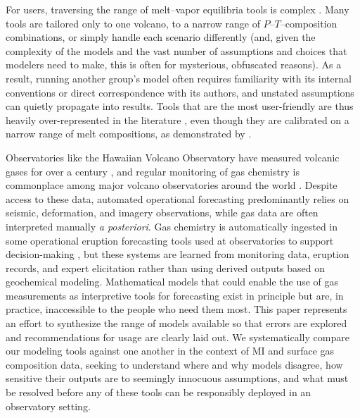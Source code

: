 \documentclass[draft, english]{volcanica-template}
\begin{document}
For users, traversing the range of melt–vapor equilibria tools is complex \parencite{papale2022thermodynamics}. Many tools are tailored only to one volcano, to a narrow range of $P$–$T$–composition combinations, or simply handle each scenario differently (and, given the complexity of the models and the vast number of assumptions and choices that modelers need to make, this is often for mysterious, obfuscated reasons). As a result, running another group's model often requires familiarity with its internal conventions or direct correspondence with its authors, and unstated assumptions can quietly propagate into results. Tools that are the most user-friendly are thus heavily over-represented in the literature \parencite[e.g., VolatileCalc;][]{Newman2002}, even though they are calibrated on a narrow range of melt compositions, as demonstrated by \textcite{WieserVESIcal2022}. 

Observatories like the Hawaiian Volcano Observatory have measured volcanic gases for over a century \parencite{sutton2014}, and regular monitoring of gas chemistry is commonplace among major volcano observatories around the world \parencite{avard2021, hanson2024}. Despite access to these data, automated operational forecasting predominantly relies on seismic, deformation, and imagery observations, while gas data are often interpreted manually \textit{a posteriori}. Gas chemistry is automatically ingested in some operational eruption forecasting tools used at observatories to support decision-making \parencite[e.g., in Aotearoa New Zealand for Ruapehu and Whakaari;][]{christophersen2022,behr2025}, but these systems are learned from monitoring data, eruption records, and expert elicitation rather than using derived outputs based on geochemical modeling. Mathematical models that could enable the use of gas measurements as interpretive tools for forecasting exist in principle but are, in practice, inaccessible to the people who need them most. This paper represents an effort to synthesize the range of models available so that errors are explored and recommendations for usage are clearly laid out. We systematically compare our modeling tools against one another in the context of MI and surface gas composition data, seeking to understand where and why models disagree, how sensitive their outputs are to seemingly innocuous assumptions, and what must be resolved before any of these tools can be responsibly deployed in an observatory setting.
\end{document}
